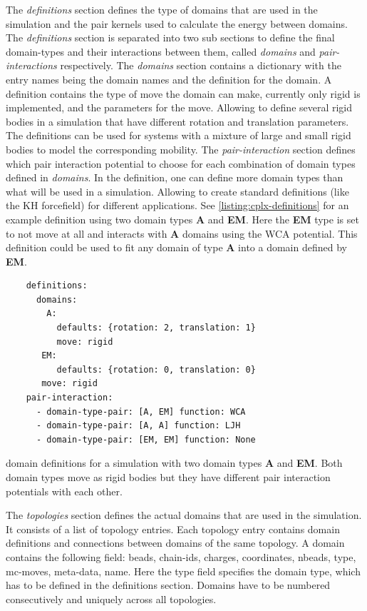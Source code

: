 \documentclass[12pt, twoside]{report}
\begin{document}
The \textit{definitions} section defines the type of domains that are used in
the simulation and the pair kernels used to calculate the energy between
domains. The \textit{definitions} section is separated into two sub sections to
define the final domain-types and their interactions between them, called
\textit{domains} and \textit{pair-interactions} respectively. The
\textit{domains} section contains a dictionary with the entry names being the
domain names and the definition for the domain. A definition contains the type
of move the domain can make, currently only rigid is implemented, and the parameters for
the move. Allowing to define several rigid bodies in a simulation that have
different rotation and translation parameters. The definitions can be used for
systems with a mixture of large and small rigid bodies to model the
corresponding mobility. The \textit{pair-interaction} section defines which pair
interaction potential to choose for each combination of domain types defined in
\textit{domains}. In the definition, one can define more domain types than what
will be used in a simulation. Allowing to create standard definitions (like the
\gls{KH} forcefield) for different applications. See
\cref{listing:cplx-definitions} for an example definition using two domain types
\textbf{A} and \textbf{EM}. Here the \textbf{EM} type is set to not move at all
and interacts with \textbf{A} domains using the \gls{WCA} potential. This
definition could be used to fit any domain of type \textbf{A} into a domain
defined by \textbf{EM}.
\begin{listing}[!ht]
  \begin{verbatim}
    definitions:
      domains:
        A:
          defaults: {rotation: 2, translation: 1}
          move: rigid
       EM:
          defaults: {rotation: 0, translation: 0}
       move: rigid
    pair-interaction:
      - domain-type-pair: [A, EM] function: WCA
      - domain-type-pair: [A, A] function: LJH
      - domain-type-pair: [EM, EM] function: None
\end{verbatim}
\caption{\complexes domain definitions for a simulation with two domain types
\textbf{A} and \textbf{EM}. Both domain types move as rigid bodies but they have
different pair interaction potentials with each other.}
\label{listing:cplx-definitions}
\end{listing}

The \textit{topologies} section defines the actual domains that are used in the
simulation. It consists of a \yaml list of topology entries. Each topology entry
contains domain definitions and connections between domains of the same
topology. A domain contains the following field: beads, chain-ids, charges,
coordinates, nbeads, type, mc-moves, meta-data, name. Here the type field
specifies the domain type, which has to be defined in the definitions section.
Domains have to be numbered consecutively and uniquely across all topologies.
\end{document}
